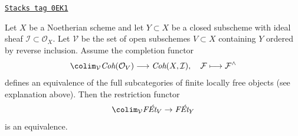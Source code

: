 \begin{lemma}
\label{pione-lemma-restriction-equivalence-general}
\href{https://stacks.math.columbia.edu/tag/0EK1}{\texttt{Stacks tag 0EK1}}

Let $X$ be a Noetherian scheme and let $Y \subset X$ be a closed subscheme
with ideal sheaf $\mathcal{I} \subset \mathcal{O}_X$.
Let $\mathcal{V}$ be the set of open subschemes $V \subset X$ containing $Y$
ordered by reverse inclusion. Assume the completion functor
$$
\colim_\mathcal{V} \textit{Coh}(\mathcal{O}_V)
\longrightarrow
\textit{Coh}(X, \mathcal{I}),
\quad
\mathcal{F} \longmapsto \mathcal{F}^\wedge
$$
defines an equivalence of the full subcategories of
finite locally free objects (see explanation above).
Then the restriction functor
$$
\colim_\mathcal{V} \textit{F\'Et}_V \to \textit{F\'Et}_Y
$$
is an equivalence.
\end{lemma}

